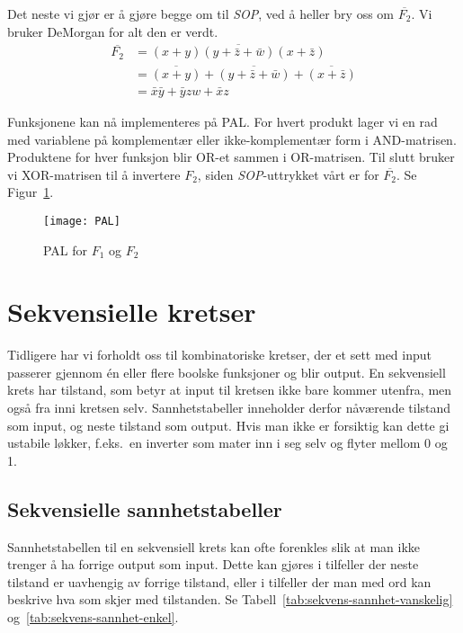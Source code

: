 \documentclass[12pt,a4paper,norsk]{article}
\begin{document}
Det neste vi gjør er å gjøre begge om til \textit{SOP}, ved å heller bry oss om
$\overline{F_2}$. Vi bruker DeMorgan for alt den er verdt.
\begin{align*}
  \overline{F_2} &= \overline{(x+y)(y+\bar{z}+\bar{w})(x+\bar{z})} \\
                 &= \overline{(x+y)} + \overline{(y+\bar{z}+\bar{w})} + \overline{(x+\bar{z})} \\
                 &= \bar{x}\bar{y} + \bar{y}zw + \bar{x}z
\end{align*}

Funksjonene kan nå implementeres på PAL. For hvert produkt lager vi en rad med
variablene på komplementær eller ikke-komplementær form i AND-matrisen.
Produktene for hver funksjon blir OR-et sammen i OR-matrisen. Til slutt bruker
vi XOR-matrisen til å invertere $F_2$, siden \textit{SOP}-uttrykket vårt er for
$\overline{F_2}$. Se Figur~\ref{fig:PAL}.

\begin{figure}[H]
  \centering
  \texttt{[image: PAL]}
  \caption{PAL for $F_1$ og $F_2$\label{fig:PAL}}
\end{figure}
\clearpage

\section{Sekvensielle kretser}
Tidligere har vi forholdt oss til kombinatoriske kretser, der et sett med input
passerer gjennom én eller flere boolske funksjoner og blir output. En sekvensiell
krets har tilstand, som betyr at input til kretsen ikke bare kommer utenfra, men
også fra inni kretsen selv. Sannhetstabeller inneholder derfor nåværende tilstand
som input, og neste tilstand som output. Hvis man ikke er forsiktig kan dette gi
ustabile løkker, f.eks.\ en inverter som mater inn i seg selv og flyter mellom 0
og 1.

\subsection{Sekvensielle sannhetstabeller}
Sannhetstabellen til en sekvensiell krets kan ofte forenkles slik at man ikke
trenger å ha forrige output som input. Dette kan gjøres i tilfeller der neste
tilstand er uavhengig av forrige tilstand, eller i tilfeller der man med ord kan
beskrive hva som skjer med tilstanden. Se
Tabell~\ref{tab:sekvens-sannhet-vanskelig} og~\ref{tab:sekvens-sannhet-enkel}.
\end{document}
